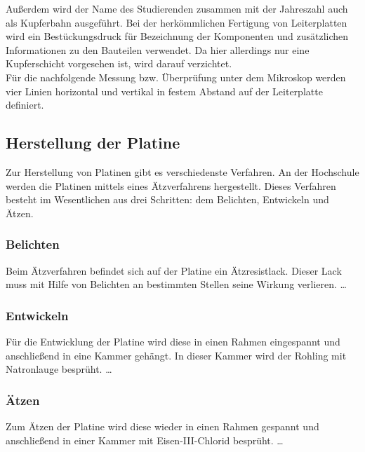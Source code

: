\noindent
Außerdem wird der Name des Studierenden zusammen mit der Jahreszahl auch als Kupferbahn ausgeführt.
Bei der herkömmlichen Fertigung von Leiterplatten wird ein Bestückungsdruck für Bezeichnung der Komponenten und zusätzlichen Informationen zu den Bauteilen verwendet.
Da hier allerdings nur eine Kupferschicht vorgesehen ist, wird darauf verzichtet.
\\
Für die nachfolgende Messung bzw. Überprüfung unter dem Mikroskop werden vier Linien horizontal und vertikal in festem Abstand auf der Leiterplatte definiert.





\subsection{Herstellung der Platine}
Zur Herstellung von Platinen gibt es verschiedenste Verfahren. An der Hochschule werden die Platinen mittels eines Ätzverfahrens hergestellt. Dieses Verfahren besteht im Wesentlichen aus drei Schritten: dem Belichten, Entwickeln und Ätzen.

\subsubsection{Belichten}
Beim Ätzverfahren befindet sich auf der Platine ein Ätzresistlack. Dieser Lack muss mit Hilfe von Belichten an bestimmten Stellen seine Wirkung verlieren. \ldots

\subsubsection{Entwickeln}
Für die Entwicklung der Platine wird diese in einen Rahmen eingespannt und anschließend in eine Kammer gehängt. In dieser Kammer wird der Rohling mit Natronlauge besprüht. \ldots

\subsubsection{Ätzen}
Zum Ätzen der Platine wird diese wieder in einen Rahmen gespannt und anschließend in einer Kammer mit Eisen-III-Chlorid besprüht. \ldots
